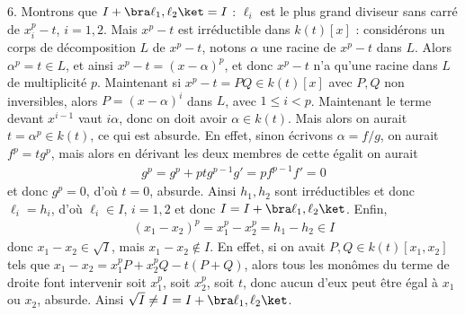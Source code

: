 \documentclass[11pt]{article}
\begin{document}
    \begin{question}{6.}
        Montrons que $I + \bra \ell_1, \ell_2 \ket = I$ : $\ell_i$ est le plus grand diviseur sans carré de $x_i^p - t$, $i = 1,2$. Mais $x^p - t$ est irréductible dans $k(t)[x]$ : considérons un corps de décomposition $L$ de $x^p - t$, notons $\alpha$ une racine de $x^p - t$ dans $L$. Alors $\alpha^p = t \in L$, et ainsi $x^p - t = (x - \alpha)^p$, et donc $x^p - t$ n'a qu'une racine dans $L$ de multiplicité $p$. Maintenant si $x^p - t = PQ \in k(t)[x]$ avec $P,Q$ non inversibles, alors $P = (x - \alpha)^i$ dans $L$, avec $1 \leq i < p$. Maintenant le terme devant $x^{i - 1}$ vaut $i\alpha$, donc on doit avoir $\alpha \in k(t)$. Mais alors on aurait $t = \alpha^p \in k(t)$, ce qui est absurde. En effet, sinon écrivons $\alpha = f/g$, on aurait $f^p = tg^p$, mais alors en dérivant les deux membres de cette égalit on aurait
        \begin{align*}
            g^p = g^p + ptg^{p-1}g' = pf^{p - 1}f' = 0
        \end{align*}
        et donc $g^p = 0$, d'où $t = 0$, absurde. Ainsi $h_1,h_2$ sont irréductibles et donc $\ell_i = h_i$, d'où $\ell_i \in I$,  $i = 1,2$ et donc $I = I + \bra \ell_1, \ell_2 \ket$. Enfin, 
        \begin{align*}
            (x_1 - x_2)^p = x_1^p - x_2^p = h_1 - h_2 \in I
        \end{align*}
        donc $x_1 - x_2 \in \sqrt{I}$, mais $x_1 - x_2 \notin I$. En effet, si on avait $P,Q \in k(t)[x_1, x_2]$ tels que $x_1 - x_2 = x_1^pP + x_2^pQ - t(P + Q)$, alors tous les monômes du terme de droite font intervenir soit $x_1^p$, soit $x_2^p$, soit $t$, donc aucun d'eux peut être égal à $x_1$ ou $x_2$, absurde. Ainsi $\sqrt{I} \neq I = I + \bra \ell_1, \ell_2 \ket$.
    \end{question}
    
\end{document}
